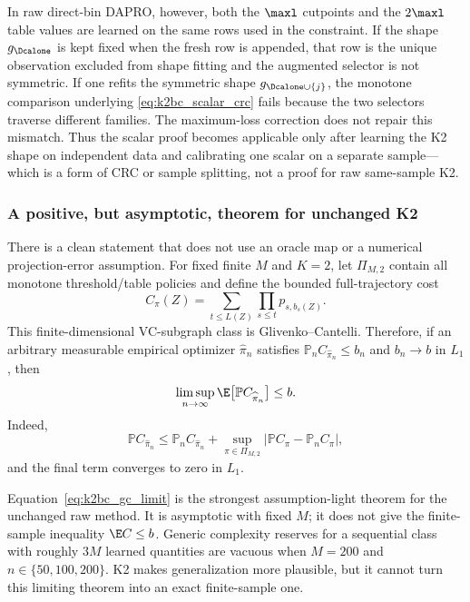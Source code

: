 In raw direct-bin DAPRO, however, both the $\maxl$ cutpoints and the $2\maxl$
table values are learned on the same rows used in the constraint.  If the
shape $g_{\Dcalone}$ is kept fixed when the fresh row is appended, that row is
the unique observation excluded from shape fitting and the augmented selector
is not symmetric.  If one refits the symmetric shape
$g_{\Dcalone\cup\{j\}}$, the monotone comparison underlying
\eqref{eq:k2bc_scalar_crc} fails because the two selectors traverse different
families.  The maximum-loss correction does not repair this mismatch.
Thus the scalar proof becomes applicable only after learning the K2 shape on
independent data and calibrating one scalar on a separate sample---which is a
form of CRC or sample splitting, not a proof for raw same-sample K2.

\subsubsection{A positive, but asymptotic, theorem for unchanged K2}

There is a clean statement that does not use an oracle map or a numerical
projection-error assumption.  For fixed finite $M$ and $K=2$, let
$\Pi_{M,2}$ contain all monotone threshold/table policies and define the
bounded full-trajectory cost
\begin{equation}
 C_\pi(Z)=\sum_{t\leq L(Z)}\prod_{s\leq t}
 p_{s,b_s(Z)}.
\end{equation}
This finite-dimensional VC-subgraph class is Glivenko--Cantelli.  Therefore,
if an arbitrary measurable empirical optimizer $\widehat\pi_n$ satisfies
$\mathbb P_nC_{\widehat\pi_n}\leq b_n$ and $b_n\to b$ in $L_1$, then
\begin{equation}
 \limsup_{n\to\infty}\E\bigl[\mathbb P
 C_{\widehat\pi_n}\bigr]\leq b.
 \label{eq:k2bc_gc_limit}
\end{equation}
Indeed,
\begin{equation}
 \mathbb PC_{\widehat\pi_n}
 \leq \mathbb P_nC_{\widehat\pi_n}
 +\sup_{\pi\in\Pi_{M,2}}|\mathbb PC_\pi-\mathbb P_nC_\pi|,
\end{equation}
and the final term converges to zero in $L_1$.

Equation~\eqref{eq:k2bc_gc_limit} is the strongest assumption-light theorem
for the unchanged raw method.  It is asymptotic with fixed $M$; it does not
give the finite-sample inequality $\E C\leq b$.  Generic complexity reserves
for a sequential class with roughly $3M$ learned quantities are vacuous when
$M=200$ and $n\in\{50,100,200\}$.  K2 makes generalization more plausible,
but it cannot turn this limiting theorem into an exact finite-sample one.

